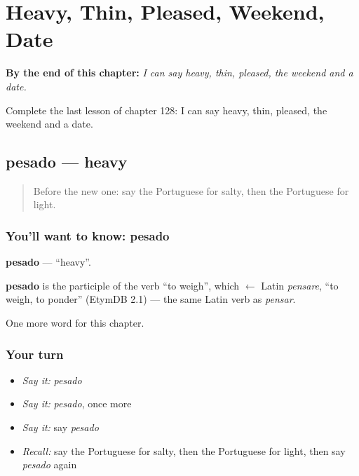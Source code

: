 
\chapter{Heavy, Thin, Pleased, Weekend, Date}
\label{ch:pt-heavy-thin-pleased-weekend-date}

\begin{chapteropening}
\textbf{By the end of this chapter:} \emph{I can say heavy, thin, pleased, the weekend and a date.}

Complete the last lesson of chapter 128: I can say heavy, thin, pleased, the weekend and a date.
\end{chapteropening}

\section[pesado]{pesado — heavy}

\label{lesson:PT-C128-pesado}



\begin{quote}
Before the new one: say the Portuguese for salty, then the Portuguese for light.
\end{quote}

\subsection*{You'll want to know: pesado}
\textbf{pesado} — \textquotedblleft{}heavy\textquotedblright{}.

\begin{cousinweb}
\textbf{pesado} is the participle of the verb \textquotedblleft{}to weigh\textquotedblright{}, which $\leftarrow$ Latin \emph{pensare}, \textquotedblleft{}to weigh, to ponder\textquotedblright{} (EtymDB 2.1) — the same Latin verb as \emph{pensar}.
\end{cousinweb}

\begin{grammarlens}[title={What you've built}]
One more word for this chapter.
\end{grammarlens}

\subsection*{Your turn}
\begin{itemize}
\raggedright
  \item \emph{Say it:} \emph{pesado}
  \item \emph{Say it:} \emph{pesado}, once more
  \item \emph{Say it:} say \emph{pesado}
  \item \emph{Recall:} say the Portuguese for salty, then the Portuguese for light, then say \emph{pesado} again
\end{itemize}

